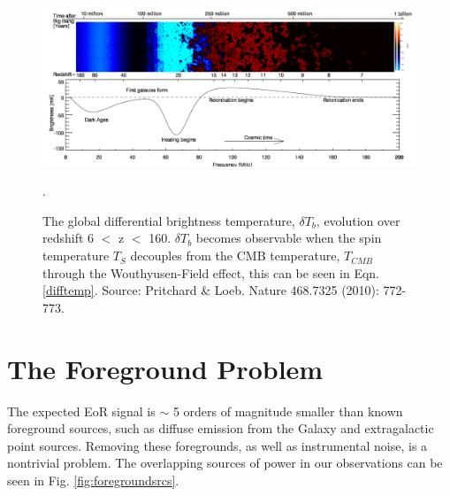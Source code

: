 \documentclass[a0,landscape]{a0poster}
\begin{document}
\begin{multicols}{4}
\begin{figure}[H]
\centering
\includegraphics[width=1.0\linewidth]{figures/global_history.png}
\caption{The global differential brightness temperature, $\delta T_b$, evolution over redshift 6 $<$ z $<$ 160. $\delta T_b$ becomes observable when 
the spin temperature $T_S$ decouples from the CMB temperature, $T_{CMB}$ through the Wouthyusen-Field effect, this can be seen in 
Eqn. \ref{difftemp}. Source: Pritchard \& Loeb. Nature 468.7325 (2010): 772-773. }.
\end{figure}

\section*{The Foreground Problem} %

The expected EoR signal is $\sim$ 5 orders of magnitude smaller than known foreground sources, such as diffuse emission from the Galaxy and extragalactic point sources. Removing these foregrounds, as well as instrumental noise, is a nontrivial problem. The overlapping sources of power in our observations can be seen in Fig. \ref{fig:foregroundsrcs}.




\end{multicols}
\end{document}
